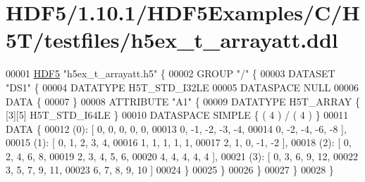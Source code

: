 \hypertarget{_h_d_f5_21_810_81_2_h_d_f5_examples_2_c_2_h5_t_2testfiles_2h5ex__t__arrayatt_8ddl_source}{}\section{H\+D\+F5/1.10.1/\+H\+D\+F5\+Examples/\+C/\+H5\+T/testfiles/h5ex\+\_\+t\+\_\+arrayatt.ddl}
\label{_h_d_f5_21_810_81_2_h_d_f5_examples_2_c_2_h5_t_2testfiles_2h5ex__t__arrayatt_8ddl_source}

\begin{DoxyCode}
00001 \hyperlink{namespace_h_d_f5}{HDF5} \textcolor{stringliteral}{"h5ex\_t\_arrayatt.h5"} \{
00002 GROUP \textcolor{stringliteral}{"/"} \{
00003    DATASET \textcolor{stringliteral}{"DS1"} \{
00004       DATATYPE  H5T\_STD\_I32LE
00005       DATASPACE  NULL
00006       DATA \{
00007       \}
00008       ATTRIBUTE \textcolor{stringliteral}{"A1"} \{
00009          DATATYPE  H5T\_ARRAY \{ [3][5] H5T\_STD\_I64LE \}
00010          DATASPACE  SIMPLE \{ ( 4 ) / ( 4 ) \}
00011          DATA \{
00012          (0): [ 0, 0, 0, 0, 0,
00013                0, -1, -2, -3, -4,
00014                0, -2, -4, -6, -8 ],
00015          (1): [ 0, 1, 2, 3, 4,
00016                1, 1, 1, 1, 1,
00017                2, 1, 0, -1, -2 ],
00018          (2): [ 0, 2, 4, 6, 8,
00019                2, 3, 4, 5, 6,
00020                4, 4, 4, 4, 4 ],
00021          (3): [ 0, 3, 6, 9, 12,
00022                3, 5, 7, 9, 11,
00023                6, 7, 8, 9, 10 ]
00024          \}
00025       \}
00026    \}
00027 \}
00028 \}
\end{DoxyCode}
